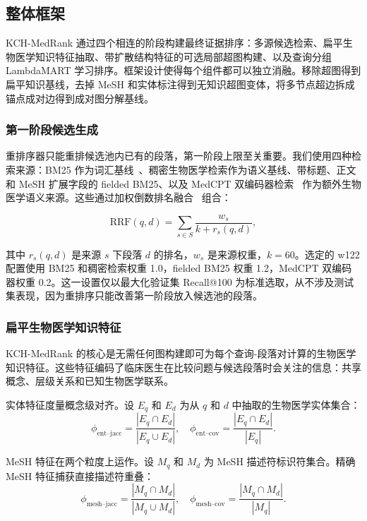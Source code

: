 \subsection{整体框架}



KCH-MedRank 通过四个相连的阶段构建最终证据排序：多源候选检索、扁平生物医学知识特征抽取、带扩散结构特征的可选局部超图构建、以及查询分组 LambdaMART 学习排序。框架设计使得每个组件都可以独立消融。移除超图得到扁平知识基线，去掉 MeSH 和实体标注得到无知识超图变体，将多节点超边拆成锚点成对边得到成对图分解基线。

\subsubsection{第一阶段候选生成}

重排序器只能重排候选池内已有的段落，第一阶段上限至关重要。我们使用四种检索来源：BM25 作为词汇基线~\citep{robertson2009bm25}、稠密生物医学检索作为语义基线、带标题、正文和 MeSH 扩展字段的 fielded BM25、以及 MedCPT 双编码器检索~\citep{jin2023medcpt} 作为额外生物医学语义来源。这些通过加权倒数排名融合~\citep{cormack2009rrf} 组合：

\[
  \mathrm{RRF}(q,d)=\sum_{s \in S}\frac{w_s}{k+r_s(q,d)},
\]

其中 $r_s(q,d)$ 是来源 $s$ 下段落 $d$ 的排名，$w_s$ 是来源权重，$k=60$。选定的 w122 配置使用 BM25 和稠密检索权重 1.0，fielded BM25 权重 1.2，MedCPT 双编码器权重 0.2。这一设置仅以最大化验证集 Recall@100 为标准选取，从不涉及测试集表现，因为重排序只能改善第一阶段放入候选池的段落。

\subsubsection{扁平生物医学知识特征}

KCH-MedRank 的核心是无需任何图构建即可为每个查询-段落对计算的生物医学知识特征。这些特征编码了临床医生在比较问题与候选段落时会关注的信息：共享概念、层级关系和已知生物医学联系。

实体特征度量概念级对齐。设 $E_q$ 和 $E_d$ 为从 $q$ 和 $d$ 中抽取的生物医学实体集合：
\[
  \phi_{\text{ent--jacc}} = \frac{|E_q \cap E_d|}{|E_q \cup E_d|}, \quad
  \phi_{\text{ent--cov}} = \frac{|E_q \cap E_d|}{|E_q|}.
\]

MeSH 特征在两个粒度上运作。设 $M_q$ 和 $M_d$ 为 MeSH 描述符标识符集合。精确 MeSH 特征捕获直接描述符重叠：
\[
  \phi_{\text{mesh--jacc}} = \frac{|M_q \cap M_d|}{|M_q \cup M_d|}, \quad
  \phi_{\text{mesh--cov}} = \frac{|M_q \cap M_d|}{|M_q|}.
\]

